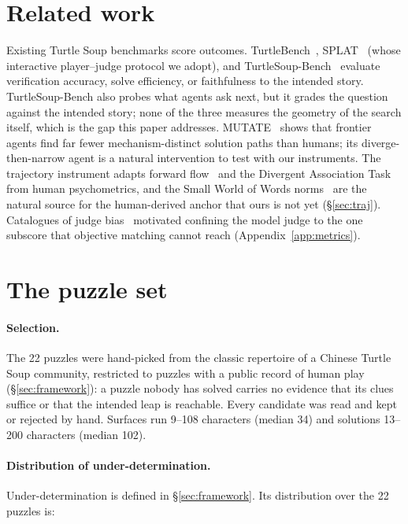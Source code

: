 \documentclass{article}
\begin{document}
\section{Related work}\label{app:rw}
Existing Turtle Soup benchmarks score outcomes. TurtleBench~\cite{turtlebench},
SPLAT~\cite{splat} (whose interactive player--judge protocol we adopt), and
TurtleSoup-Bench~\cite{tsbench} evaluate verification accuracy, solve
efficiency, or faithfulness to the intended story. TurtleSoup-Bench also
probes what agents ask next, but it grades the question against the intended
story; none of the three measures the geometry of the search itself, which is
the gap this paper addresses. MUTATE~\cite{mutate} shows that frontier agents
find far fewer mechanism-distinct solution paths than humans; its
diverge-then-narrow agent is a natural intervention to test with our
instruments. The trajectory instrument adapts forward
flow~\cite{forwardflow} and the Divergent Association Task~\cite{dat} from
human psychometrics, and the Small World of Words norms~\cite{swow} are the
natural source for the human-derived anchor that ours is not yet
(\S\ref{sec:traj}). Catalogues of judge bias~\cite{calm,posbias} motivated
confining the model judge to the one subscore that objective matching cannot
reach (Appendix~\ref{app:metrics}).

\section{The puzzle set}\label{app:set}

\paragraph{Selection.} The 22 puzzles were hand-picked from the classic
repertoire of a Chinese Turtle Soup community, restricted to puzzles with a
public record of human play (\S\ref{sec:framework}): a puzzle nobody has
solved carries no evidence that its clues suffice or that the intended leap
is reachable. Every candidate was read and kept or rejected by hand.
Surfaces run 9--108 characters (median 34) and solutions 13--200 characters
(median 102).

\paragraph{Distribution of under-determination.} Under-determination is
defined in \S\ref{sec:framework}. Its distribution over the 22 puzzles is:
\end{document}
